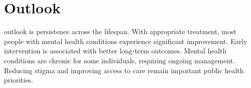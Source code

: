 \section{Outlook}
outlook is persistence across the lifespan. With appropriate treatment, most people with mental health conditions experience significant improvement. Early intervention is associated with better long-term outcomes. Mental health conditions are chronic for some individuals, requiring ongoing management. Reducing stigma and improving access to care remain important public health priorities.
